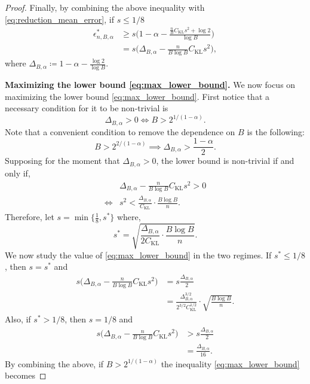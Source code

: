 \documentclass{article}
\theoremstyle{plain}
\theoremstyle{definition}
\theoremstyle{remark}
\begin{document}
\begin{proof}
Finally, by combining the above inequality with \eqref{eq:reduction_mean_error}, if $s \leq 1/8$
\begin{align*}
    \epsilon^*_{n,B, \alpha} 
     &\geq s \Big( 1 - \alpha - \frac{\frac{n}{B} C_\mathrm{KL}s^2  + \log 2}{\log B} \Big) \\
     &= s \Big( \Delta_{B, \alpha} - \frac{n}{B\log B} C_\mathrm{KL}s^2 \Big),  \tag{\theequation}\label{eq:max_lower_bound}
\end{align*}
where $\Delta_{B, \alpha} \coloneqq 1 - \alpha- \frac{\log 2}{\log B}.$ 

\textbf{Maximizing the lower bound \eqref{eq:max_lower_bound}.} We now focus on maximizing the lower bound \eqref{eq:max_lower_bound}. First notice that a necessary condition for it to be non-trivial is
$$
\Delta_{B, \alpha} > 0 \Leftrightarrow B> 2^{1/(1- \alpha)}.
$$
Note that a convenient condition to remove the dependence on $B$ is the following:
\begin{equation}
    \label{eq:B_condition_alpha}
    B> 2^{2/(1- \alpha)} \implies \Delta_{B, \alpha} > \frac{1 - \alpha}{2}.
\end{equation}
Supposing for the moment that $\Delta_{B, \alpha} >0$, the lower bound is non-trivial if and only if,
\begin{align*}
   & \Delta_{B, \alpha} - \frac{n}{B\log B} C_\mathrm{KL}s^2 > 0 \\
   \Leftrightarrow & s^2 < \frac{\Delta_{B, \alpha}}{C_\mathrm{KL}}  \cdot \frac{B \log B}{n}.
\end{align*}
Therefore, let $s = \min\{ \frac{1}{8}, s^* \}$ where,
$$
s^* = \sqrt{\frac{\Delta_{B, \alpha}}{2 C_\mathrm{KL}}  \cdot \frac{B \log B}{n}}.
$$
We now study the value of \eqref{eq:max_lower_bound} in the two regimes. If $s^* \leq 1/8$, then $s = s^*$ and
\begin{align*}
    s \Big(\Delta_{B, \alpha} - \frac{n}{B\log B} C_\mathrm{KL}s^2 \Big) &= s\frac{\Delta_{B, \alpha}}{2}  \\
    &= \frac{\Delta_{B, \alpha}^{3/2}}{2^{3/2}  C_\mathrm{KL}^{1/2}} \cdot \sqrt{\frac{B \log B}{n}}.
\end{align*}
Also, if $s^* > 1/8$, then $s= 1/8$ and
\begin{align*}
    s \Big(\Delta_{B, \alpha} - \frac{n}{B\log B} C_\mathrm{KL}s^2 \Big) &> s\frac{\Delta_{B, \alpha}}{2}  \\
    &= \frac{\Delta_{B, \alpha}}{16}.
\end{align*}
By combining the above, if $B > 2^{1/(1-\alpha)}$ the inequality \eqref{eq:max_lower_bound} becomes

\end{proof}
\end{document}
